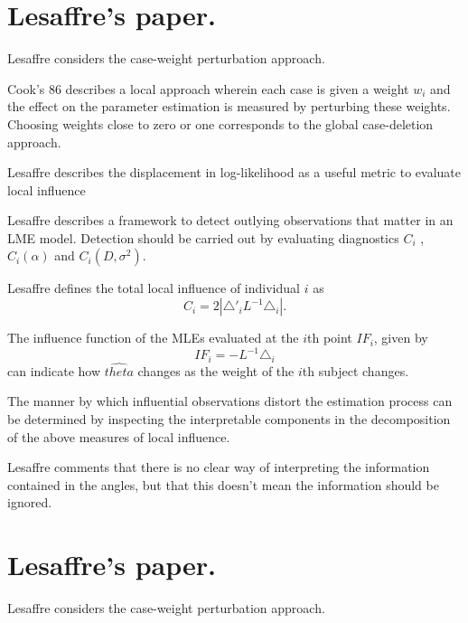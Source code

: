 \documentclass[Main.tex]{subfiles}
\begin{document}
\newpage
\section{Lesaffre's paper.} %

Lesaffre considers the case-weight perturbation approach.


Cook's 86 describes a local approach wherein each case is given a weight $w_{i}$ and the effect on the parameter estimation is measured by perturbing these weights. Choosing weights close to zero or one corresponds to the global case-deletion approach.

Lesaffre  describes the displacement in log-likelihood as a useful metric to evaluate local influence %


Lesaffre describes a framework to detect outlying observations that matter in an LME model. Detection should be carried out by evaluating diagnostics $C_{i}$ , $C_{i}(\alpha)$ and $C_{i}(D,\sigma^2)$.


Lesaffre defines the total local influence of individual $i$ as
\begin{equation}
C_{i} = 2 | \triangle \prime _{i} L^{-1} \triangle_{i}|.
\end{equation}


The influence function of the MLEs evaluated at the $i$th point $IF_{i}$, given by
\begin{equation}
IF_{i} = -L^{-1}\triangle _{i}
\end{equation}
can indicate how $\hat{theta}$ changes as the weight of the $i$th
subject changes.

The manner by which influential observations distort the estimation process can be determined by inspecting the
interpretable components in the decomposition of the above measures of local influence.


Lesaffre comments that there is no clear way of interpreting the information contained in the angles, but that this doesn't mean the information should be ignored.

\newpage
\section{Lesaffre's paper.} %

Lesaffre considers the case-weight perturbation approach.
\end{document}
